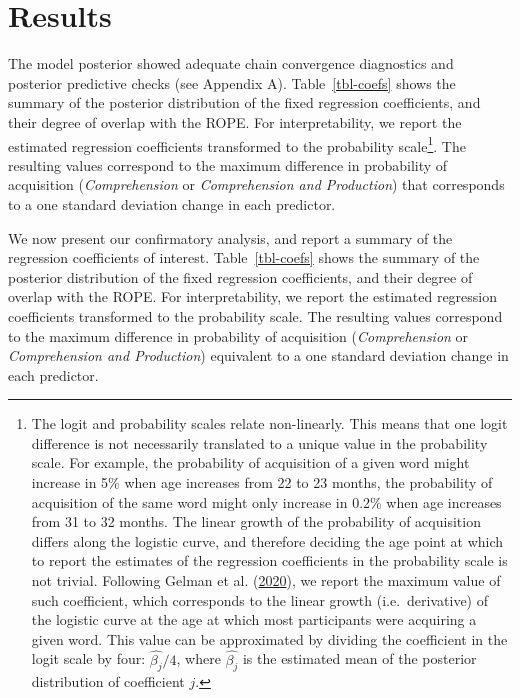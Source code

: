 \documentclass[
]{article}
\begin{document}
\hypertarget{sec-results}{%
\section{Results}\label{sec-results}}

The model posterior showed adequate chain convergence diagnostics and
posterior predictive checks (see Appendix A). Table~\ref{tbl-coefs}
shows the summary of the posterior distribution of the fixed regression
coefficients, and their degree of overlap with the ROPE. For
interpretability, we report the estimated regression coefficients
transformed to the probability scale\footnote{The logit and probability
  scales relate non-linearly. This means that one logit difference is
  not necessarily translated to a unique value in the probability scale.
  For example, the probability of acquisition of a given word might
  increase in 5\% when age increases from 22 to 23 months, the
  probability of acquisition of the same word might only increase in
  0.2\% when age increases from 31 to 32 months. The linear growth of
  the probability of acquisition differs along the logistic curve, and
  therefore deciding the age point at which to report the estimates of
  the regression coefficients in the probability scale is not trivial.
  Following Gelman et al.
  (\protect\hyperlink{ref-gelman2020regression}{2020}), we report the
  maximum value of such coefficient, which corresponds to the linear
  growth (i.e.~derivative) of the logistic curve at the age at which
  most participants were acquiring a given word. This value can be
  approximated by dividing the coefficient in the logit scale by four:
  \(\hat{\beta_j}/4\), where \(\hat{\beta_j}\) is the estimated mean of
  the posterior distribution of coefficient \(j\).}. The resulting
values correspond to the maximum difference in probability of
acquisition (\emph{Comprehension} or \emph{Comprehension and
Production}) that corresponds to a one standard deviation change in each
predictor.

We now present our confirmatory analysis, and report a summary of the
regression coefficients of interest. Table~\ref{tbl-coefs} shows the
summary of the posterior distribution of the fixed regression
coefficients, and their degree of overlap with the ROPE. For
interpretability, we report the estimated regression coefficients
transformed to the probability scale. The resulting values correspond to
the maximum difference in probability of acquisition
(\emph{Comprehension} or \emph{Comprehension and Production}) equivalent
to a one standard deviation change in each predictor.
\end{document}
